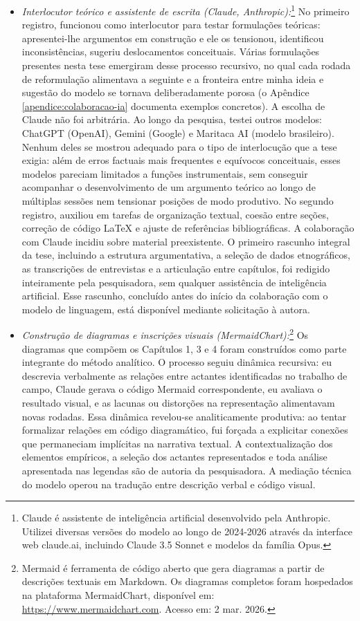 \begin{itemize}

\item \textit{Interlocutor teórico e assistente de escrita (Claude, Anthropic):}\footnote{Claude é assistente de inteligência artificial desenvolvido pela Anthropic. Utilizei diversas versões do modelo ao longo de 2024-2026 através da interface web claude.ai, incluindo Claude 3.5 Sonnet e modelos da família Opus.} No primeiro registro, funcionou como interlocutor para testar formulações teóricas: apresentei-lhe argumentos em construção e ele os tensionou, identificou inconsistências, sugeriu deslocamentos conceituais. Várias formulações presentes nesta tese emergiram desse processo recursivo, no qual cada rodada de reformulação alimentava a seguinte e a fronteira entre minha ideia e sugestão do modelo se tornava deliberadamente porosa (o Apêndice \ref{apendice:colaboracao-ia} documenta exemplos concretos). A escolha de Claude não foi arbitrária. Ao longo da pesquisa, testei outros modelos: ChatGPT (OpenAI), Gemini (Google) e Maritaca AI (modelo brasileiro). Nenhum deles se mostrou adequado para o tipo de interlocução que a tese exigia: além de erros factuais mais frequentes e equívocos conceituais, esses modelos pareciam limitados a funções instrumentais, sem conseguir acompanhar o desenvolvimento de um argumento teórico ao longo de múltiplas sessões nem tensionar posições de modo produtivo. No segundo registro, auxiliou em tarefas de organização textual, coesão entre seções, correção de código LaTeX e ajuste de referências bibliográficas. A colaboração com Claude incidiu sobre material preexistente. O primeiro rascunho integral da tese, incluindo a estrutura argumentativa, a seleção de dados etnográficos, as transcrições de entrevistas e a articulação entre capítulos, foi redigido inteiramente pela pesquisadora, sem qualquer assistência de inteligência artificial. Esse rascunho, concluído antes do início da colaboração com o modelo de linguagem, está disponível mediante solicitação à autora.

\item \textit{Construção de diagramas e inscrições visuais (MermaidChart):}\footnote{Mermaid é ferramenta de código aberto que gera diagramas a partir de descrições textuais em Markdown. Os diagramas completos foram hospedados na plataforma MermaidChart, disponível em: \url{https://www.mermaidchart.com}. Acesso em: 2 mar. 2026.} Os diagramas que compõem os Capítulos 1, 3 e 4 foram construídos como parte integrante do método analítico. O processo seguiu dinâmica recursiva: eu descrevia verbalmente as relações entre actantes identificadas no trabalho de campo, Claude gerava o código Mermaid correspondente, eu avaliava o resultado visual, e as lacunas ou distorções na representação alimentavam novas rodadas. Essa dinâmica revelou-se analiticamente produtiva: ao tentar formalizar relações em código diagramático, fui forçada a explicitar conexões que permaneciam implícitas na narrativa textual. A contextualização dos elementos empíricos, a seleção dos actantes representados e toda análise apresentada nas legendas são de autoria da pesquisadora. A mediação técnica do modelo operou na tradução entre descrição verbal e código visual.


\end{itemize}
